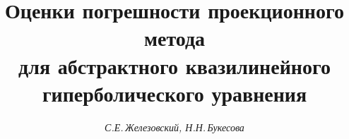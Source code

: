 









\newcommand{\col}{\operatorname{col}}


\newcommand{\tts}[1]{}







 


\setcounter{page}{94}















\author{\it С.Е.\,Железовский, Н.Н.\,Букесова}




\title{Оценки погрешности проекционного метода\\


для абстрактного квазилинейного\\


гиперболического уравнения}





\date{}




\pagestyle{plain} %







